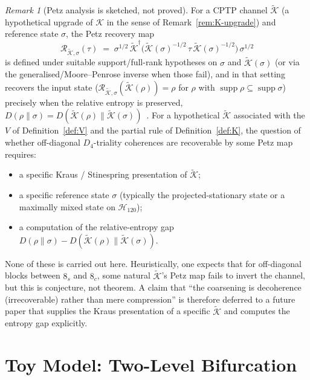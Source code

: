 \documentclass[12pt]{article}
\theoremstyle{definition}
\theoremstyle{remark}
\newtheorem{remark}[theorem]{Remark}
\newcommand{\Hcal}{\mathcal{H}}
\newcommand{\Kcal}{\mathcal{K}}
\begin{document}
\begin{remark}[Petz analysis is sketched, not proved]\label{rem:petz-sketch}
For a CPTP channel $\widetilde{\Kcal}$ (a hypothetical upgrade of $\Kcal$ in the sense of Remark~\ref{rem:K-upgrade}) and reference state $\sigma$, the Petz recovery map~\citep{Petz1986}
\[
    \mathcal{R}_{\widetilde{\Kcal},\sigma}(\tau) \;=\; \sigma^{1/2}\,\widetilde{\Kcal}^\dagger\bigl(\widetilde{\Kcal}(\sigma)^{-1/2}\,\tau\,\widetilde{\Kcal}(\sigma)^{-1/2}\bigr)\,\sigma^{1/2}
\]
is defined under suitable support/full-rank hypotheses on $\sigma$ and $\widetilde{\Kcal}(\sigma)$ (or via the generalised/Moore--Penrose inverse when those fail), and in that setting recovers the input state ($\mathcal{R}_{\widetilde{\Kcal},\sigma}(\widetilde{\Kcal}(\rho)) = \rho$ for $\rho$ with $\operatorname{supp}\rho \subseteq \operatorname{supp}\sigma$) precisely when the relative entropy is preserved, $D(\rho\|\sigma) = D(\widetilde{\Kcal}(\rho)\|\widetilde{\Kcal}(\sigma))$~\citep{HiaiPetz1991}. For a hypothetical $\widetilde{\Kcal}$ associated with the $V$ of Definition~\ref{def:V} and the partial rule of Definition~\ref{def:K}, the question of whether off-diagonal $D_4$-triality coherences are recoverable by some Petz map requires:

\begin{itemize}
\item a specific Kraus / Stinespring presentation of $\widetilde{\Kcal}$;
\item a specific reference state $\sigma$ (typically the projected-stationary state or a maximally mixed state on $\Hcal_{120}$);
\item a computation of the relative-entropy gap $D(\rho\|\sigma) - D(\widetilde{\Kcal}(\rho)\|\widetilde{\Kcal}(\sigma))$.
\end{itemize}

None of these is carried out here. Heuristically, one expects that for off-diagonal blocks between $8_s$ and $8_c$, some natural $\widetilde{\Kcal}$'s Petz map fails to invert the channel, but this is conjecture, not theorem. A claim that ``the coarsening is decoherence (irrecoverable) rather than mere compression'' is therefore deferred to a future paper that supplies the Kraus presentation of a specific $\widetilde{\Kcal}$ and computes the entropy gap explicitly.
\end{remark}

\section{Toy Model: Two-Level Bifurcation}\label{sec:toy}
\end{document}
